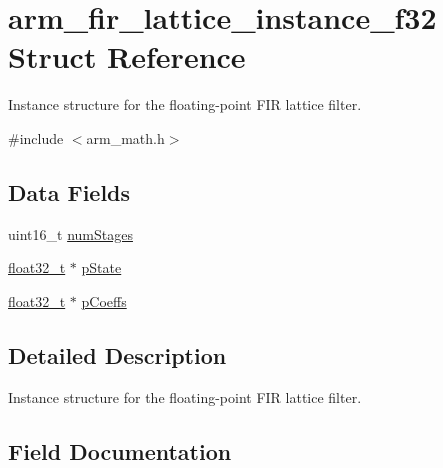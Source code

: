\hypertarget{structarm__fir__lattice__instance__f32}{}\section{arm\+\_\+fir\+\_\+lattice\+\_\+instance\+\_\+f32 Struct Reference}
\label{structarm__fir__lattice__instance__f32}


Instance structure for the floating-\/point F\+IR lattice filter.  




{\ttfamily \#include $<$arm\+\_\+math.\+h$>$}

\subsection*{Data Fields}
\begin{DoxyCompactItemize}
\item 
uint16\+\_\+t \mbox{\hyperlink{structarm__fir__lattice__instance__f32_a4cceb90547b3e585d4c7aabaa8057212}{num\+Stages}}
\item 
\mbox{\hyperlink{arm__math_8h_a4611b605e45ab401f02cab15c5e38715}{float32\+\_\+t}} $\ast$ \mbox{\hyperlink{structarm__fir__lattice__instance__f32_a335c87e6fdc4b96601d95a5de8b9c463}{p\+State}}
\item 
\mbox{\hyperlink{arm__math_8h_a4611b605e45ab401f02cab15c5e38715}{float32\+\_\+t}} $\ast$ \mbox{\hyperlink{structarm__fir__lattice__instance__f32_aacbb8dd8eeba4b21fc2bb40076405ee3}{p\+Coeffs}}
\end{DoxyCompactItemize}


\subsection{Detailed Description}
Instance structure for the floating-\/point F\+IR lattice filter. 

\subsection{Field Documentation}
\mbox{\label{structarm__fir__lattice__instance__f32_a4cceb90547b3e585d4c7aabaa8057212}} 
